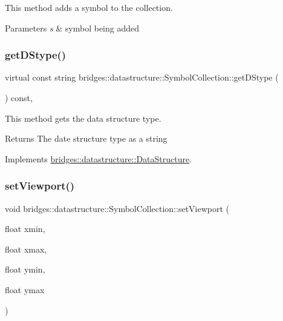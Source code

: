 This method adds a symbol to the collection. 


\begin{DoxyParams}{Parameters}
{\em s} & symbol being added \\
\hline
\end{DoxyParams}
\mbox{\label{classbridges_1_1datastructure_1_1_symbol_collection_a8f63c31a48a12127978967b706fc38f5}} 
\subsubsection{\texorpdfstring{get\+D\+Stype()}{getDStype()}}
{\footnotesize\ttfamily virtual const string bridges\+::datastructure\+::\+Symbol\+Collection\+::get\+D\+Stype (\begin{DoxyParamCaption}{ }\end{DoxyParamCaption}) const\hspace{0.3cm}{\ttfamily [inline]}, {\ttfamily [virtual]}}



This method gets the data structure type. 

\begin{DoxyReturn}{Returns}
The date structure type as a string 
\end{DoxyReturn}


Implements \hyperlink{classbridges_1_1datastructure_1_1_data_structure_a4ff66cb34409f11fe9fc647f6d8a22ce}{bridges\+::datastructure\+::\+Data\+Structure}.

\mbox{\label{classbridges_1_1datastructure_1_1_symbol_collection_a8853f758e4e8ab7f9cef5bf4d0494027}} 
\subsubsection{\texorpdfstring{set\+Viewport()}{setViewport()}}
{\footnotesize\ttfamily void bridges\+::datastructure\+::\+Symbol\+Collection\+::set\+Viewport (\begin{DoxyParamCaption}\item[{float}]{xmin,  }\item[{float}]{xmax,  }\item[{float}]{ymin,  }\item[{float}]{ymax }\end{DoxyParamCaption})\hspace{0.3cm}{\ttfamily [inline]}}



